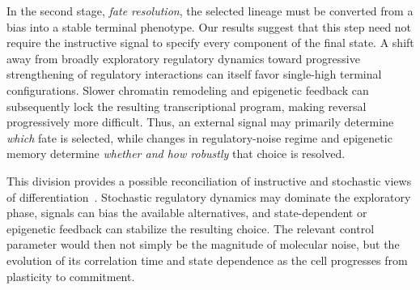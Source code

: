 \documentclass[11pt]{article}
\providecommand{\DIFaddtex}[1]{{\protect\color{red}#1}} %
\providecommand{\DIFdeltex}[1]{} %
\providecommand{\DIFaddbegin}{} %
\providecommand{\DIFaddend}{} %
\providecommand{\DIFdelbegin}{} %
\providecommand{\DIFdelend}{} %
\providecommand{\DIFadd}[1]{\texorpdfstring{\DIFaddtex{#1}}{#1}} %
\providecommand{\DIFdel}[1]{\texorpdfstring{\DIFdeltex{#1}}{}} %
\providecommand{\DIFaddincludegraphics}[2][]{\DIFOincludegraphics[#1]{#2}} %
\providecommand{\DIFdelincludegraphics}[2][]{}
\DeclareRobustCommand{\DIFaddbegin}{\DIFOaddbegin \let\includegraphics\DIFaddincludegraphics} %
\DeclareRobustCommand{\DIFaddend}{\DIFOaddend \let\includegraphics\DIFOincludegraphics} %
\DeclareRobustCommand{\DIFdelbegin}{\DIFOdelbegin \let\includegraphics\DIFdelincludegraphics} %
\DeclareRobustCommand{\DIFdelend}{\DIFOaddend \let\includegraphics\DIFOincludegraphics} %
\begin{document}
In the second stage, \emph{fate resolution}, the selected lineage must be converted from a bias into a stable terminal phenotype. Our results suggest that this step need not require the instructive signal to specify every component of the final state. A shift away from broadly exploratory regulatory dynamics toward \DIFdelbegin \DIFdel{state-dependent reinforcement }\DIFdelend \DIFaddbegin \DIFadd{progressive strengthening of regulatory interactions }\DIFaddend can itself favor single-high terminal configurations. Slower chromatin remodeling and epigenetic feedback can subsequently lock the resulting transcriptional program, making reversal progressively more difficult. Thus, an external signal may primarily determine \emph{which} fate is selected, while changes in regulatory-noise regime and epigenetic memory determine \emph{whether and how robustly} that choice is resolved.

This division provides a possible reconciliation of instructive and stochastic views of differentiation~\cite{Enver1998DoDice, Safina2024NewGenomics}. Stochastic regulatory dynamics may dominate the exploratory phase, signals can bias the available alternatives, and state-dependent or epigenetic feedback can stabilize the resulting choice. The relevant control parameter would then not simply be the magnitude of molecular noise, but the evolution of its correlation time and state dependence as the cell progresses from plasticity to commitment.
\end{document}
